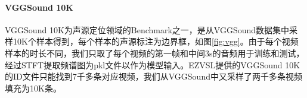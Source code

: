 \documentclass[12pt]{article}
\begin{document}
\paragraph{VGGSound 10K} VGGSound 10K为声源定位领域的Benchmark之一，是从VGGSound数据集中采样10K个样本得到，每个样本的声源标注为边界框，如图\ref{fig:vgg}。由于每个视频样本的时长不同，我们只取了每个视频的第一帧和中间3s的音频用于训练和测试，经过STFT提取频谱图为pkl文件以作为模型输入。EZVSL提供的VGGSound 10K的ID文件只能找到7千多条对应视频，我们从VGGSound中又采样了两千多条视频填充为10K条。
\begin{figure}[!h]
  \centering
\end{figure}
\end{document}
